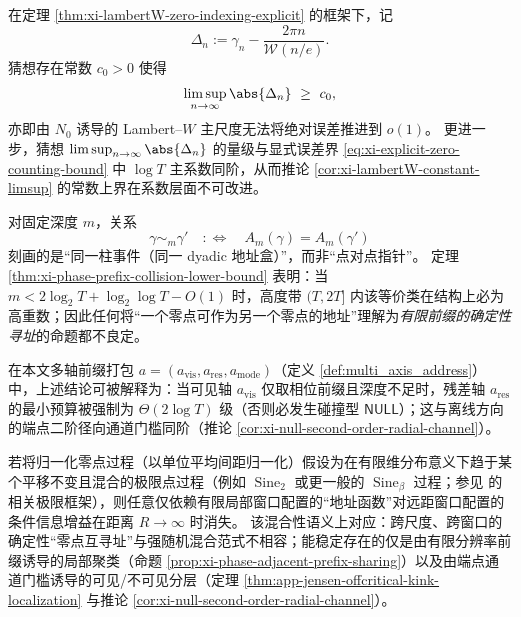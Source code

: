 \begin{conjecture}\label{conj:xi-lambertW-constant-sharpness}
在定理 \ref{thm:xi-lambertW-zero-indexing-explicit} 的框架下，记
\[
\Delta_n:=\gamma_n-\frac{2\pi n}{\mathscr{W}(n/e)}.
\]
猜想存在常数 \(c_0>0\) 使得
\[
\limsup_{n\to\infty}\abs{\Delta_n}\ \ge\ c_0,
\]
亦即由 \(N_0\) 诱导的 Lambert--\(W\) 主尺度无法将绝对误差推进到 \(o(1)\)。
更进一步，猜想 \(\limsup_{n\to\infty}\abs{\Delta_n}\) 的量级与显式误差界 \eqref{eq:xi-explicit-zero-counting-bound} 中 \(\log T\) 主系数同阶，从而推论 \ref{cor:xi-lambertW-constant-limsup} 的常数上界在系数层面不可改进。
\end{conjecture}

\begin{remark}\label{rem:xi-phase-prefix-not-pointer}
对固定深度 \(m\)，关系
\[
\gamma\sim_m\gamma'\quad:\Longleftrightarrow\quad A_m(\gamma)=A_m(\gamma')
\]
刻画的是“同一柱事件（同一 dyadic 地址盒）”，而非“点对点指针”。
定理 \ref{thm:xi-phase-prefix-collision-lower-bound} 表明：当 \(m<2\log_2T+\log_2\log T-O(1)\) 时，高度带 \((T,2T]\) 内该等价类在结构上必为高重数；因此任何将“一个零点可作为另一个零点的地址”理解为\emph{有限前缀的确定性寻址}的命题都不良定。
\par
在本文多轴前缀打包 \(a=(a_{\mathrm{vis}},a_{\mathrm{res}},a_{\mathrm{mode}})\)（定义 \ref{def:multi_axis_address}）中，上述结论可被解释为：当可见轴 \(a_{\mathrm{vis}}\) 仅取相位前缀且深度不足时，残差轴 \(a_{\mathrm{res}}\) 的最小预算被强制为 \(\Theta(2\log T)\) 级（否则必发生碰撞型 \(\mathsf{NULL}\)）；这与离线方向的端点二阶径向通道门槛同阶（推论 \ref{cor:xi-null-second-order-radial-channel}）。
\end{remark}

\begin{remark}\label{rem:xi-phase-mixing-no-addressing}
若将归一化零点过程（以单位平均间距归一化）假设为在有限维分布意义下趋于某个平移不变且混合的极限点过程（例如 \(\operatorname{Sine}_2\) 或更一般的 \(\operatorname{Sine}_\beta\) 过程；参见 \cite{AriasDeReynaRodgers2024ConvergencePointsZetaZeros,ChhaibiNajnudel2018RigiditySineBeta} 的相关极限框架），则任意仅依赖有限局部窗口配置的“地址函数”对远距窗口配置的条件信息增益在距离 \(R\to\infty\) 时消失。
该混合性语义上对应：跨尺度、跨窗口的确定性“零点互寻址”与强随机混合范式不相容；能稳定存在的仅是由有限分辨率前缀诱导的局部聚类（命题 \ref{prop:xi-phase-adjacent-prefix-sharing}）以及由端点通道门槛诱导的可见/不可见分层（定理 \ref{thm:app-jensen-offcritical-kink-localization} 与推论 \ref{cor:xi-null-second-order-radial-channel}）。
\end{remark}

\endinput
